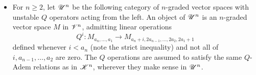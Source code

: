 \documentclass[11pt]{article}
\newcommand{\LL}[1]{{\scrK}^{#1}}%
\newcommand{\GR}[1]{\scrV^{#1}}%
\newcommand{\nontop}[1]{\scrU^{#1}}%
\newcommand{\LambdaOp}{Q}
\begin{document}
\begin{CategoriesOfInterest}
\begin{itemize}

\item For $n\geq2$, let $\nontop{n}$ be the following category of $n$-graded vector spaces with unstable $\LambdaOp$ operators acting from the left. An object of $\nontop{n}$ is an $n$-graded vector space $M$ in $\GR{n}$,
admitting linear operations
\[\LambdaOp^i:M_{a_n,\ldots,a_1}\to M_{a_n+i,2a_{n-1},\ldots,2a_2,2a_1+1}\]
defined whenever $i< a_n$ (note the strict inequality) and not all of $i,a_{n-1},\ldots,a_{2}$ are zero.
The $\LambdaOp$ operations are assumed to satisfy the same $\LambdaOp$-Adem relations as in $\LL{n}$, wherever they make sense in $\nontop{n}$. %
\end{itemize}



\end{CategoriesOfInterest}
\end{document}
